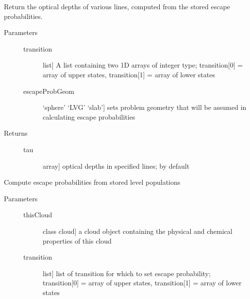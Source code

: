 \documentclass[letterpaper,10pt,english]{sphinxmanual}
\begin{document}
\begin{fulllineitems}
\begin{fulllineitems}
\label{fulldoc:despotic.emitter.opticalDepth}
Return the optical depths of various lines, computed from the
stored escape probabilities.
\begin{description}
\item[{Parameters}] \leavevmode\begin{description}
\item[{transition}] \leavevmode{[}list{]}
A list containing two 1D arrays of integer type;
transition{[}0{]} = array of upper states, transition{[}1{]} =
array of lower states

\item[{escapeProbGeom}] \leavevmode{[}`sphere' \textbar{} `LVG' \textbar{} `slab'{]}
sets problem geometry that will be assumed in calculating
escape probabilities

\end{description}

\item[{Returns}] \leavevmode\begin{description}
\item[{tau}] \leavevmode{[}array{]}
optical depths in specified lines; by default

\end{description}

\end{description}

\end{fulllineitems}


\begin{fulllineitems}
\label{fulldoc:despotic.emitter.setEscapeProb}
Compute escape probabilities from stored level populations
\begin{description}
\item[{Parameters}] \leavevmode\begin{description}
\item[{thisCloud}] \leavevmode{[}class cloud{]}
a cloud object containing the physical and chemical
properties of this cloud

\item[{transition}] \leavevmode{[}list{]}
list of transition for which to set escape probability;
transition{[}0{]} = array of upper states, transition{[}1{]} =
array of lower states


\end{description}
\end{description}
\end{fulllineitems}
\end{fulllineitems}
\end{document}
